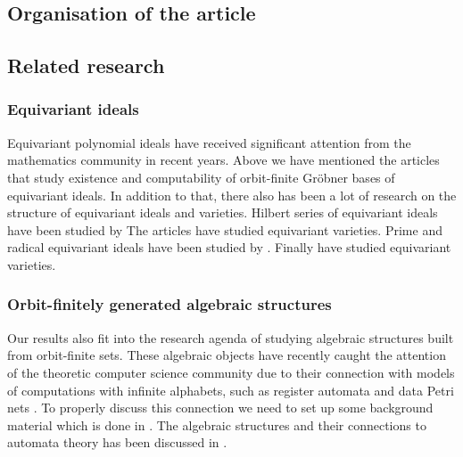 \subsection{Organisation of the article}
%
\subsection{Related research}
%
\subsubsection{Equivariant ideals}
%
Equivariant polynomial ideals have received significant attention from the mathematics community in recent years. 
Above we have mentioned the articles that study existence and computability of orbit-finite Gr\"{o}bner bases of equivariant ideals.
In addition to that,
there also has been a lot of research on the structure of equivariant ideals and varieties.
Hilbert series of equivariant ideals have been studied by \cite{NaRo17,KrLeSn17,MaNa21,Na21}
The articles \cite{DEKL15,NaSn20} have studied equivariant varieties.
Prime and radical equivariant ideals have been studied by \cite{NaSn21,KuRi25,Sn24}.
Finally \cite{SaSn16,SaSn19,Yu25,NSY25} have studied equivariant varieties.
%
\subsubsection{Orbit-finitely generated algebraic structures}
%
Our results also fit into the research agenda of studying algebraic structures built from orbit-finite sets.
These algebraic objects have recently caught the attention of the theoretic computer science community due to their connection with models of computations with infinite alphabets,
such as register automata and data Petri nets
\cite{Boj13,BoSt20,Ste24,BFKM24,YBK26,GHL22,GHL25,Gho25,ramsey}.
To properly discuss this connection we need to set up some background material which is done in .
The algebraic structures and their connections to automata theory has been discussed in .


